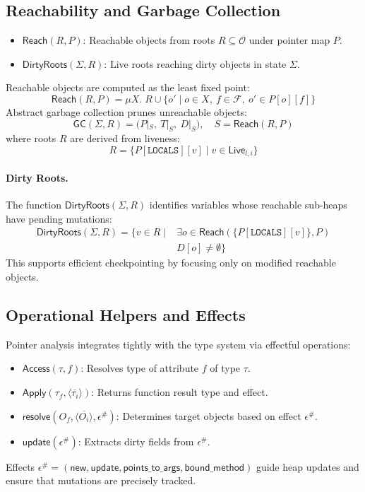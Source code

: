 \subsection{Reachability and Garbage Collection}

\begin{itemize}
    \item $\mathsf{Reach}(R, P)$: Reachable objects from roots $R \subseteq \mathcal{O}$ under pointer map $P$.
    \item $\mathsf{DirtyRoots}(\Sigma, R)$: Live roots reaching dirty objects in state $\Sigma$.
\end{itemize}

Reachable objects are computed as the least fixed point:
\[
\mathsf{Reach}(R,P) = \mu X.\; R \cup \{ o' \mid o \in X,\ f \in \mathcal{F},\ o' \in P[o][f] \}
\]
Abstract garbage collection prunes unreachable objects:
\[
\mathsf{GC}(\Sigma,R) = \big( P|_S,\ T|_S,\ D|_S \big),
\quad
S = \mathsf{Reach}(R,P)
\]
where roots $R$ are derived from liveness:
\[
R = \big\{ P[\mathtt{LOCALS}][v] \mid v \in \mathsf{Live}_{l,i} \big\}
\]

\paragraph{Dirty Roots.}
The function $\mathsf{DirtyRoots}(\Sigma,R)$ identifies variables whose reachable sub-heaps have pending mutations:
\begin{align*}
\mathsf{DirtyRoots}(\Sigma,R) = \{ v \in R \mid & \exists o \in \mathsf{Reach}(\{P[\mathtt{LOCALS}][v]\},P) \\
                                                & D[o] \neq \emptyset \}
\end{align*}
This supports efficient checkpointing by focusing only on modified reachable objects.

\subsection{Operational Helpers and Effects}

Pointer analysis integrates tightly with the type system via effectful operations:
\begin{itemize}
    \item $\mathsf{Access}(\tau,f)$: Resolves type of attribute $f$ of type $\tau$.
    \item $\mathsf{Apply}(\tau_f,\langle\overline{\tau_i}\rangle)$: Returns function result type and effect.
    \item $\mathsf{resolve}(O_f,\langle\overline{O_i}\rangle,\epsilon^\#)$: Determines target objects based on effect $\epsilon^\#$.
    \item $\mathsf{update}(\epsilon^\#)$: Extracts dirty fields from $\epsilon^\#$.
\end{itemize}
Effects $\epsilon^\# = (\mathsf{new},\mathsf{update},\mathsf{points\_to\_args},\mathsf{bound\_method})$ guide heap updates and ensure that mutations are precisely tracked.

